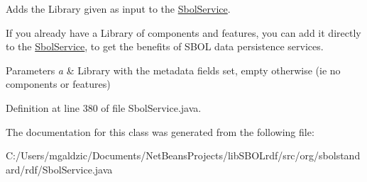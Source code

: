 Adds the Library given as input to the \hyperlink{classorg_1_1sbolstandard_1_1rdf_1_1_sbol_service}{SbolService}. 

If you already have a Library of components and features, you can add it directly to the \hyperlink{classorg_1_1sbolstandard_1_1rdf_1_1_sbol_service}{SbolService}, to get the benefits of SBOL data persistence services.


\begin{DoxyParams}{Parameters}
{\em a} & Library with the metadata fields set, empty otherwise (ie no components or features) \\
\hline
\end{DoxyParams}


Definition at line 380 of file SbolService.java.



The documentation for this class was generated from the following file:\begin{DoxyCompactItemize}
\item 
C:/Users/mgaldzic/Documents/NetBeansProjects/libSBOLrdf/src/org/sbolstandard/rdf/SbolService.java\end{DoxyCompactItemize}
